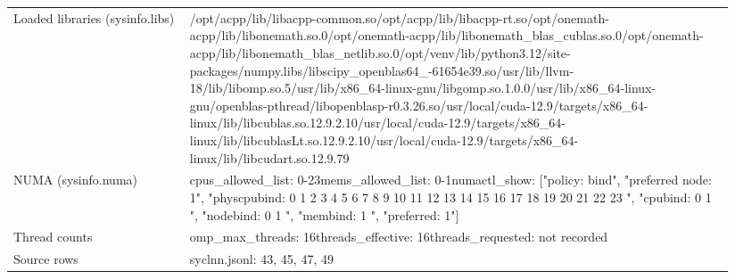 \begin{longtable}{>{\raggedright\arraybackslash}p{0.23\linewidth}>{\raggedright\arraybackslash}p{0.71\linewidth}}
Loaded libraries (sysinfo.libs) & /\allowbreak{}opt/\allowbreak{}acpp/\allowbreak{}lib/\allowbreak{}libacpp-common.so\newline /\allowbreak{}opt/\allowbreak{}acpp/\allowbreak{}lib/\allowbreak{}libacpp-rt.so\newline /\allowbreak{}opt/\allowbreak{}onemath-acpp/\allowbreak{}lib/\allowbreak{}libonemath.so.0\newline /\allowbreak{}opt/\allowbreak{}onemath-acpp/\allowbreak{}lib/\allowbreak{}libonemath\_\allowbreak{}blas\_\allowbreak{}cublas.so.0\newline /\allowbreak{}opt/\allowbreak{}onemath-acpp/\allowbreak{}lib/\allowbreak{}libonemath\_\allowbreak{}blas\_\allowbreak{}netlib.so.0\newline /\allowbreak{}opt/\allowbreak{}venv/\allowbreak{}lib/\allowbreak{}python3.12/\allowbreak{}site-packages/\allowbreak{}numpy.libs/\allowbreak{}libscipy\_\allowbreak{}openblas64\_\allowbreak{}-61654e39.so\newline /\allowbreak{}usr/\allowbreak{}lib/\allowbreak{}llvm-18/\allowbreak{}lib/\allowbreak{}libomp.so.5\newline /\allowbreak{}usr/\allowbreak{}lib/\allowbreak{}x86\_\allowbreak{}64-linux-gnu/\allowbreak{}libgomp.so.1.0.0\newline /\allowbreak{}usr/\allowbreak{}lib/\allowbreak{}x86\_\allowbreak{}64-linux-gnu/\allowbreak{}openblas-pthread/\allowbreak{}libopenblasp-r0.3.26.so\newline /\allowbreak{}usr/\allowbreak{}local/\allowbreak{}cuda-12.9/\allowbreak{}targets/\allowbreak{}x86\_\allowbreak{}64-linux/\allowbreak{}lib/\allowbreak{}libcublas.so.12.9.2.10\newline /\allowbreak{}usr/\allowbreak{}local/\allowbreak{}cuda-12.9/\allowbreak{}targets/\allowbreak{}x86\_\allowbreak{}64-linux/\allowbreak{}lib/\allowbreak{}libcublasLt.so.12.9.2.10\newline /\allowbreak{}usr/\allowbreak{}local/\allowbreak{}cuda-12.9/\allowbreak{}targets/\allowbreak{}x86\_\allowbreak{}64-linux/\allowbreak{}lib/\allowbreak{}libcudart.so.12.9.79 \\
NUMA (sysinfo.numa) & cpus\_\allowbreak{}allowed\_\allowbreak{}list: 0-23\newline mems\_\allowbreak{}allowed\_\allowbreak{}list: 0-1\newline numactl\_\allowbreak{}show: ["policy: bind", "preferred node: 1", "physcpubind: 0 1 2 3 4 5 6 7 8 9 10 11 12 13 14 15 16 17 18 19 20 21 22 23 ", "cpubind: 0 1 ", "nodebind: 0 1 ", "membind: 1 ", "preferred: 1"] \\
Thread counts & omp\_\allowbreak{}max\_\allowbreak{}threads: 16\newline threads\_\allowbreak{}effective: 16\newline threads\_\allowbreak{}requested: not recorded \\
Source rows & syclnn.jsonl: 43, 45, 47, 49 \\
\end{longtable}
